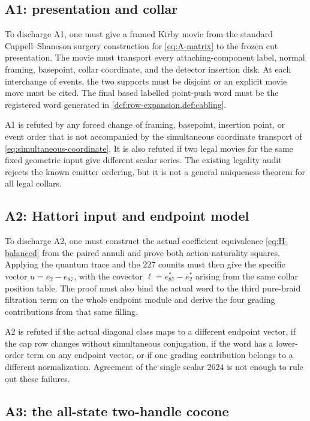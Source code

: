 \documentclass[10pt,reqno]{amsart}
\theoremstyle{definition}
\theoremstyle{remark}
\begin{document}
\subsection{A1: presentation and collar}

To discharge A1, one must give a framed Kirby movie from the standard
Cappell--Shaneson surgery construction for \cref{eq:A-matrix} to the frozen
cut presentation.  The movie must transport every attaching-component label,
normal framing, basepoint, collar coordinate, and the detector insertion disk.
At each interchange of events, the two supports must be disjoint or an
explicit movie move must be cited.  The final based labelled point-push word
must be the registered word generated in \cref{def:row-expansion,def:cabling}.

A1 is refuted by any forced change of framing, basepoint, insertion point, or
event order that is not accompanied by the simultaneous coordinate transport
of \cref{eq:simultaneous-coordinate}.  It is also refuted if two legal movies
for the same fixed geometric input give different scalar series.  The existing
legality audit rejects the known emitter ordering, but it is not a general
uniqueness theorem for all legal collars.

\subsection{A2: Hattori input and endpoint model}

To discharge A2, one must construct the actual coefficient equivalence
\cref{eq:H-balanced} from the paired annuli and prove both action-naturality
squares.  Applying the quantum trace and the $227$ counits must then give the
specific vector $u=e_2-e_{87}$, with the covector
$\ell=e_{87}^*-e_2^*$ arising from the same collar position table.  The proof
must also bind the actual word to the third pure-braid filtration term on the
whole endpoint module and derive the four grading contributions from that
same filling.

A2 is refuted if the actual diagonal class maps to a different endpoint
vector, if the cap row changes without simultaneous conjugation, if the word
has a lower-order term on any endpoint vector, or if one grading contribution
belongs to a different normalization.  Agreement of the single scalar
$2624$ is not enough to rule out these failures.

\subsection{A3: the all-state two-handle cocone}
\end{document}
